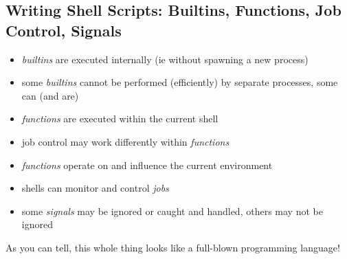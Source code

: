 \documentclass[xga]{xdvislides}
\begin{document}
\subsection{Writing Shell Scripts: Builtins, Functions, Job Control, Signals}
\begin{itemize}
	\item {\em builtins} are executed internally (ie without spawning a
		new process)
	\item some {\em builtins} cannot be performed (efficiently) by
		separate processes, some can (and are)
	\item {\em functions} are executed within the current shell
	\item job control may work differently within {\em functions}
	\item {\em functions} operate on and influence the current environment
	\item shells can monitor and control {\em jobs}
	\item some {\em signals} may be ignored or caught and handled, others
		may not be ignored
\end{itemize}
\addvspace{.5in}
As you can tell, this whole thing looks like a full-blown programming language!
\end{document}
